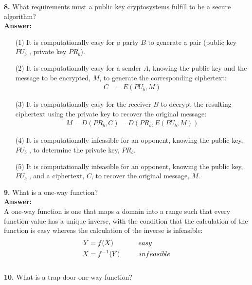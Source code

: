 \documentclass[paper=a4, fontsize=11pt]{scrartcl} %
\numberwithin{equation}{section} %
\numberwithin{figure}{section} %
\numberwithin{table}{section} %
\begin{document}
 \textbf{8.} What requirements must a public key cryptosystems fulfill to be a secure algorithm?\\

 \textbf{Answer:}

 \begin{enumerate}
 \item[(1)] It is computationally easy for $a$ party $B$ to generate a pair (public key $PU_{b}$ , private key $PR_{b}$).
 \item[(2)] It is computationally easy for a sender $A$, knowing the public key and the message to be encrypted, $M$, to generate the corresponding ciphertext:
   \begin{align}
   C &= E( PU_{b}, M)
   \end{align}
 \item[(3)] It is computationally easy for the receiver $B$ to decrypt the resulting ciphertext using the private key to recover the original message:
  \begin{align}
  M = D(PR_{b} , C) = D(PR_{b} , E(PU_{b} , M))
  \end{align}
 \item[(4)] It is computationally infeasible for an opponent, knowing the public key, $PU_{b}$ , to determine the private key, $PR_{b}$.
 \item[(5)] It is computationally infeasible for an opponent, knowing the public key, $PU_{b}$ , and a ciphertext, $C$, to recover the original message, $M$.\\
 \end{enumerate}



 \textbf{9.} What is a one-way function?\\

 \textbf{Answer:}\\

  A one-way function is one that maps $a$ domain into a range such that every function value has a unique inverse, with the condition that the calculation of the function is easy whereas the calculation of the inverse is infeasible:
 \begin{align}
 Y &= f(X)  \hspace{1.3cm} easy \\
 X &= f^{-1}(Y) \hspace{1cm} infeasible
 \end{align}
 \\
 
 \textbf{10.} What is a trap-door one-way function?\\
\end{document}
